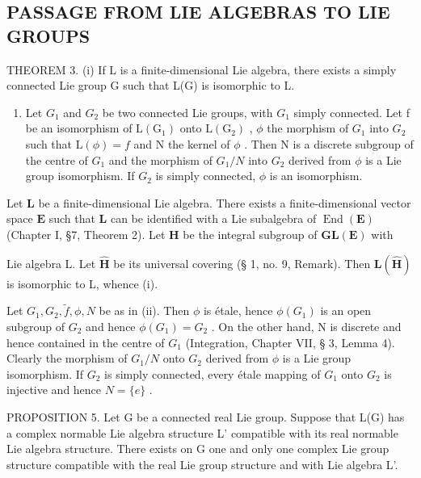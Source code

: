 \subsection{PASSAGE FROM LIE ALGEBRAS TO LIE GROUPS}

THEOREM 3. (i) If L is a finite-dimensional Lie algebra, there exists a simply connected Lie group G such that L(G) is isomorphic to L.

\begin{enumerate}
\def\labelenumi{(\roman{enumi})}
\setcounter{enumi}{1}
\tightlist
\item
  Let \(G_{1}\) and \(G_{2}\) be two connected Lie groups, with \(G_{1}\) simply connected. Let f be an isomorphism of \(\mathrm{L}(\mathrm{G}_{1})\) onto \(\mathrm{L}(\mathrm{G}_{2})\) , \(\phi\) the morphism of \(G_{1}\) into \(G_{2}\) such that \(\mathrm{L}(\phi)=f\) and N the kernel of \(\phi\) . Then N is a discrete subgroup of the centre of \(G_{1}\) and the morphism of \(G_{1}/N\) into \(G_{2}\) derived from \(\phi\) is a Lie group isomorphism. If \(G_{2}\) is simply connected, \(\phi\) is an isomorphism.
\end{enumerate}

Let \(\mathbf{L}\) be a finite-dimensional Lie algebra. There exists a finite-dimensional vector space \(\mathbf{E}\) such that \(\mathbf{L}\) can be identified with a Lie subalgebra of \(\operatorname{End}(\mathbf{E})\) (Chapter I, §7, Theorem 2). Let \(\mathbf{H}\) be the integral subgroup of \(\mathbf{GL}(\mathbf{E})\) with

Lie algebra L. Let \(\hat{\mathbf{H}}\) be its universal covering (§ 1, no. 9, Remark). Then \(\mathbf{L}(\hat{\mathbf{H}})\) is isomorphic to L, whence (i).

Let \(G_{1}, G_{2}, \tilde{f}, \phi, N\) be as in (ii). Then \(\phi\) is étale, hence \(\phi(G_{1})\) is an open subgroup of \(G_{2}\) and hence \(\phi(G_{1}) = G_{2}\) . On the other hand, N is discrete and hence contained in the centre of \(G_{1}\) (Integration, Chapter VII, § 3, Lemma 4). Clearly the morphism of \(G_{1}/N\) onto \(G_{2}\) derived from \(\phi\) is a Lie group isomorphism. If \(G_{2}\) is simply connected, every étale mapping of \(G_{1}\) onto \(G_{2}\) is injective and hence \(N = \{e\}\) .

PROPOSITION 5. Let G be a connected real Lie group. Suppose that L(G) has a complex normable Lie algebra structure L' compatible with its real normable Lie algebra structure. There exists on G one and only one complex Lie group structure compatible with the real Lie group structure and with Lie algebra L'.

